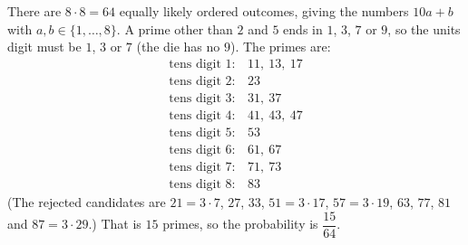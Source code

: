 There are $8\cdot8=64$ equally likely ordered outcomes, giving the numbers $10a+b$ with $a,b\in\{1,\dots,8\}$. A prime other than $2$ and $5$ ends in $1$, $3$, $7$ or $9$, so the units digit must be $1$, $3$ or $7$ (the die has no $9$). The primes are:
\[
\begin{array}{ll}
\text{tens digit }1: & 11,\ 13,\ 17\\
\text{tens digit }2: & 23\\
\text{tens digit }3: & 31,\ 37\\
\text{tens digit }4: & 41,\ 43,\ 47\\
\text{tens digit }5: & 53\\
\text{tens digit }6: & 61,\ 67\\
\text{tens digit }7: & 71,\ 73\\
\text{tens digit }8: & 83
\end{array}
\]
(The rejected candidates are $21=3\cdot7$, $27$, $33$, $51=3\cdot17$, $57=3\cdot19$, $63$, $77$, $81$ and $87=3\cdot29$.) That is $15$ primes, so the probability is $\boxed{\dfrac{15}{64}}$.
